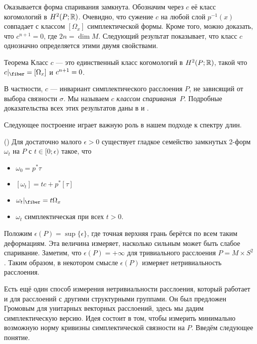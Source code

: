 Оказывается форма спаривания замкнута.
Обозначим через $c$ её класс когомологий в $H^2 (P;\mathbb{R})$.
Очевидно, что сужение $c$ на любой слой $p^{-1}(x)$ совпадает с классом $[\Omega_x]$
симплектической формы.  
Кроме того, можно доказать, что $c^{n+1} = 0$, где $2n = \dim M$.
Следующий результат показывает, что класс $c$ однозначно определяется
этими двумя свойствами. 

\begin{thm}{Теорема}\label{9.3.A}
  Класс $c$ — это единственный класс когомологий в $H^2 (P;\mathbb{R})$,
  такой что $c|_{\fiber} = [\Omega_x]$ и $c^{n+1} \z= 0$.
\end{thm}

В частности, $c$ — инвариант симплектического расслоения $P$, не
зависящий от выбора связности $\sigma$. 
Мы называем $c$ \emph{классом спаривания}~$P$.
Подробные доказательства всех этих результатов даны в \cite{GLS} и \cite{MS}.

Следующее построение играет важную роль в нашем подходе к спектру длин.

(\cite{GLS,MS})
Для достаточно малого $\epsilon > 0$ существует гладкое семейство
замкнутых 2-форм $\omega_t$ на $P$ с $t \in [0;\epsilon)$ такое, что 
\begin{itemize}
\item $\omega_0 = p^\ast \tau$
\item $[\omega_t] = tc + p^\ast [\tau]$
\item $\omega_t|_{\fiber} = t\Omega_x$
\item $\omega_t$ симплектическая при всех $t > 0$.
\end{itemize}

Положим $\epsilon(P) = \sup \{\epsilon\}$, где точная верхняя грань берётся по всем таким деформациям. 
Эта величина измеряет, насколько сильным может быть слабое спаривание.
Заметим, что $\epsilon(P) = +\infty$ для тривиального расслоения $P = M \times S^2$.
Таким образом, в некотором смысле $\epsilon(P)$ измеряет нетривиальность расслоения.

Есть ещё один способ измерения нетривиальности расслоения, который работает и для расслоений с другими структурными группами.
Он был предложен Громовым \cite{G2} для унитарных векторных расслоений, здесь мы дадим симплектическую версию.
Идея состоит в том, чтобы измерить минимально возможную норму кривизны симплектической связности на $P$.
Введём следующее понятие.

